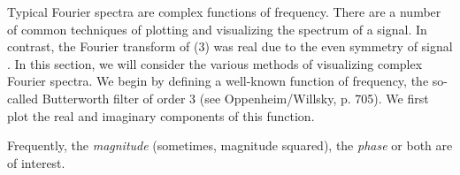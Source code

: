 \documentclass{article}
\begin{document}
\begin{CellGroup}


Typical Fourier spectra are complex functions of frequency. There are a number of common techniques of plotting and visualizing the spectrum of a
signal. In contrast, the Fourier transform of (3) was real due to the even symmetry of signal .  In this section, we will consider
the various methods of visualizing complex Fourier spectra. We begin by defining a well-known function of frequency, the so-called Butterworth filter
of order 3 (see Oppenheim/Willsky, p. 705). We first plot the real and imaginary components of this function. 



\begin{CellGroup}

\end{CellGroup}
\begin{CellGroup}

\end{CellGroup}
Frequently, the {\itshape magnitude} (sometimes, magnitude squared), the {\itshape phase} or both are of interest.




\end{CellGroup}
\end{document}
